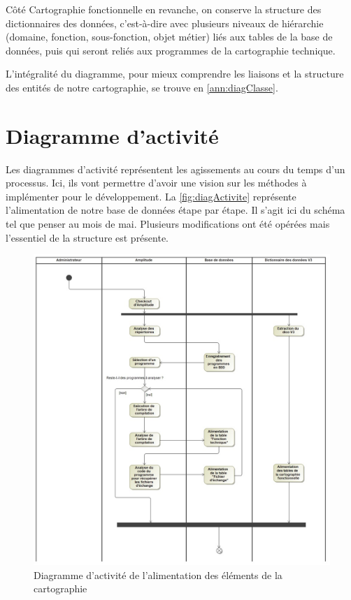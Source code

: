\documentclass{polytech/polytech}
\begin{document}
Côté Cartographie fonctionnelle en revanche, on conserve la structure des dictionnaires des données, c'est-à-dire avec plusieurs niveaux de hiérarchie (domaine, fonction, sous-fonction, objet métier) liés aux tables de la base de données, puis qui seront reliés aux programmes de la cartographie technique. 

L'intégralité du diagramme, pour mieux comprendre les liaisons et la structure des entités de notre cartographie, se trouve en \autoref{ann:diagClasse}.

\section{Diagramme d'activité}

Les diagrammes d'activité représentent les agissements au cours du temps d'un processus. Ici, ils vont permettre d'avoir une vision sur les méthodes à implémenter pour le développement. La \autoref{fig:diagActivite} représente l'alimentation de notre base de données étape par étape. Il s'agit ici du schéma tel que penser au mois de mai. Plusieurs modifications ont été opérées mais l'essentiel de la structure est présente. 

\begin{figure}
	\includegraphics[scale=0.45]{images/Alimentation_initiale}
	\caption{Diagramme d'activité de l'alimentation des éléments de la cartographie}
	\label{fig:diagActivite}
\end{figure}
\end{document}
